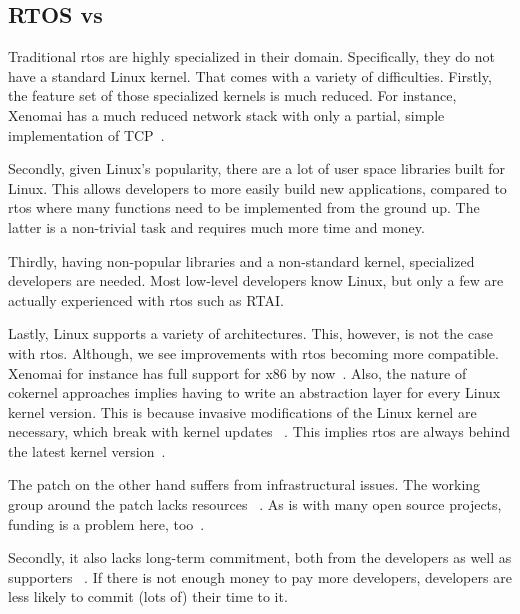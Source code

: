 \documentclass[10pt,twocolumn,a4paper]{article}
\begin{document}
\subsection{RTOS vs }
Traditional \acrshort{rtos} are highly specialized in their domain.
Specifically, they do not have a standard Linux kernel.
That comes with a variety of difficulties.
Firstly, the feature set of those specialized kernels is much reduced.
For instance, Xenomai has a much reduced network stack with only a partial, simple implementation of TCP~\cite{xenomai_network_2024}.

Secondly, given Linux's popularity, there are a lot of user space libraries built for Linux.
This allows developers to more easily build new applications, compared to \acrshort{rtos} where many functions need to be implemented from the ground up.
The latter is a non-trivial task and requires much more time and money.

Thirdly, having non-popular libraries and a non-standard kernel, specialized developers are needed.
Most low-level developers know Linux, but only a few are actually experienced with \acrshort{rtos} such as RTAI.

Lastly, Linux supports a variety of architectures.
This, however, is not the case with \acrshort{rtos}.
Although, we see improvements with \acrshort{rtos} becoming more compatible.
Xenomai for instance has full support for x86 by now~\cite{xenomai_supported}.
Also, the nature of cokernel approaches implies having to write an abstraction layer for every Linux kernel version.
This is because invasive modifications of the Linux kernel are necessary, which break with kernel updates ~\cite{reghenzani_realtime_2019}.
This implies \acrshort{rtos} are always behind the latest kernel version~\cite{xenomai-docs}.
\newline

\noindent The  patch on the other hand suffers from infrastructural issues.
The working group around the patch lacks resources ~\cite{perlow_trenches_2021}.
As is with many open source projects, funding is a problem here, too~\cite{perlow_trenches_2021}.

Secondly, it also lacks long-term commitment, both from the developers as well as supporters ~\cite{perlow_trenches_2021}.
If there is not enough money to pay more developers, developers are less likely to commit (lots of) their time to it.
\end{document}
